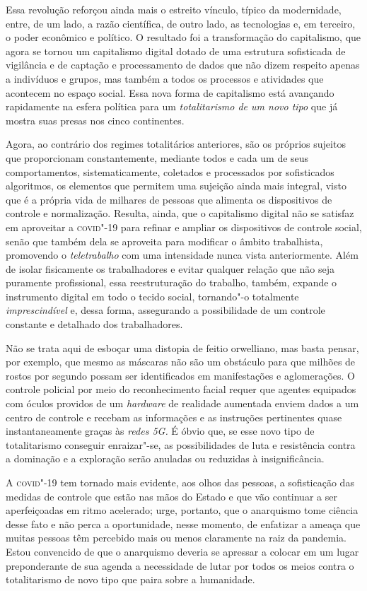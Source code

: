 Essa revolução reforçou ainda mais o estreito vínculo, típico da
modernidade, entre, de um lado, a razão científica, de outro lado, as
tecnologias e, em terceiro, o poder econômico e político. O resultado
foi a transformação do capitalismo, que agora se tornou um capitalismo
digital dotado de uma estrutura sofisticada de vigilância e de captação
e processamento de dados que não dizem respeito apenas a indivíduos e
grupos, mas também a todos os processos e atividades que acontecem no
espaço social. Essa nova forma de capitalismo está avançando rapidamente
na esfera política para um \textit{totalitarismo de um novo tipo} que já
mostra suas presas nos cinco continentes.

Agora, ao contrário dos regimes totalitários anteriores, são os próprios
sujeitos que proporcionam constantemente, mediante todos e cada um de
seus comportamentos, sistematicamente, coletados e processados por
sofisticados algoritmos, os elementos que permitem uma sujeição ainda
mais integral, visto que é a própria vida de milhares de pessoas que
alimenta os dispositivos de controle e normalização. Resulta, ainda, que
o capitalismo digital não se satisfaz em aproveitar a \textsc{covid}"-19 para
refinar e ampliar os dispositivos de controle social, senão que também
dela se aproveita para modificar o âmbito trabalhista, promovendo o
\textit{teletrabalho} com uma intensidade nunca vista anteriormente.
Além de isolar fisicamente os trabalhadores e evitar qualquer relação
que não seja puramente profissional, essa reestruturação do trabalho,
também, expande o instrumento digital em todo o tecido social,
tornando"-o totalmente \textit{imprescindível} e, dessa forma,
assegurando a possibilidade de um controle constante e detalhado dos
trabalhadores.

Não se trata aqui de esboçar uma distopia de feitio orwelliano, mas
basta pensar, por exemplo, que mesmo as máscaras não são um obstáculo
para que milhões de rostos por segundo possam ser identificados em
manifestações e aglomerações. O controle policial por meio do
reconhecimento facial requer que agentes equipados com óculos providos
de um \emph{hardware} de realidade aumentada enviem dados a um centro de
controle e recebam as informações e as instruções pertinentes quase
instantaneamente graças às \textit{redes 5G.} É óbvio que, se esse novo
tipo de totalitarismo conseguir enraizar"-se, as possibilidades de luta e
resistência contra a dominação e a exploração serão anuladas ou
reduzidas à insignificância.

A \textsc{covid}"-19 tem tornado mais evidente, aos olhos das pessoas, a
sofisticação das medidas de controle que estão nas mãos do Estado e que
vão continuar a ser aperfeiçoadas em ritmo acelerado; urge, portanto,
que o anarquismo tome ciência desse fato e não perca a oportunidade,
nesse momento, de enfatizar a ameaça que muitas pessoas têm percebido
mais ou menos claramente na raiz da pandemia.
Estou convencido de que o
anarquismo deveria se apressar a colocar em um lugar preponderante de
sua agenda a necessidade de lutar por todos os meios contra o
totalitarismo de novo tipo que paira sobre a humanidade.

